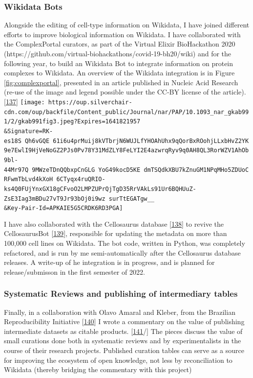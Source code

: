 \hypertarget{wikidata-bots}{%
\subsubsection{Wikidata Bots}\label{wikidata-bots}}

Alongside the editing of cell-type information on Wikidata, I have joined different efforts to improve biological information on Wikidata.
I have collaborated with the ComplexPortal curators, as part of the Virtual Elixir BioHackathon 2020 (https://github.com/virtual-biohackathons/covid-19-bh20/wiki) and for the following year, to build an Wikidata Bot to integrate information on protein complexes to Wikidata. An overview of the Wikidata integration is in Figure \ref{fig:complexportal}, presented in an article published in Nucleic Acid Research (re-use of the image and legend possible under the CC-BY license of the article). {[}\protect\hyperlink{ref-CQRJ53gu}{137}{]}
\texttt{[image: https://oup.silverchair-cdn.com/oup/backfile/Content\_public/Journal/nar/PAP/10.1093\_nar\_gkab991/2/gkab991fig3.jpeg?Expires=1641821957\\\&Signature=RK-es18S~Qh6vGQE~61i6u4prMuij8kVTbrjN6WUJLfYHOAhUhx9qQorBxROohjLLxbHvZ2YK9e7EwlI9HjVeNoGZ2PJs0Pv78Y31MdZLY8FeLYI2E4azwrqRyv9q0AH8QL3RorWZV1AhOb9bl-44Mr97Q~9MWzeTDnQQbxpCnGLG~YoG49kocD5KE~dmTSQdkXBU7kZnuGM1NPqMHo5ZDUoCRFwmTbLvd4kXoH~6CTyqx4ruQRIO-ks4Q0FUjYnxGX18gCFvoO2LMPZUPrQjTgD35RrVAkLs91Ur6BQHUuZ-ZsE3Iag3mBDu27vT9Jr93bOj0i9wz~surTtEGATgw\_\_\\\&Key-Pair-Id=APKAIE5G5CRDK6RD3PGA]}

I have also collaborated with the Cellosaurus database {[}\protect\hyperlink{ref-1DguATd9G}{138}{]} to revive the CellosaurusBot {[}\protect\hyperlink{ref-lMQxhx3q}{139}{]}, responsible for updating the metadata on more than 100,000 cell lines on Wikidata. The bot code, written in Python, was completely refactored, and is run by me semi-automatically after the Cellosaurus database releases. A write-up of he integration is in progress, and is planned for release/submisson in the first semester of 2022.

\hypertarget{systematic-reviews-and-publishing-of-intermediary-tables}{%
\subsubsection{Systematic Reviews and publishing of intermediary tables}\label{systematic-reviews-and-publishing-of-intermediary-tables}}

Finally, in a collaboration with Olavo Amaral and Kleber, from the Brazilian Reproducibility Initiative {[}\protect\hyperlink{ref-F2mYjDJ0}{140}{]} I wrote a commentary on the value of publishing intermediate datasets as citable products. {[}\protect\hyperlink{ref-HbZ13t8l}{141}/{]}
The pieces discuss the value of small curations done both in systematic reviews and by experimentalists in the course of their research projects. Published curation tables can serve as a source for improving the ecosystem of open knowledge, not less by reconciliation to Wikidata (thereby bridging the commentary with this project)

